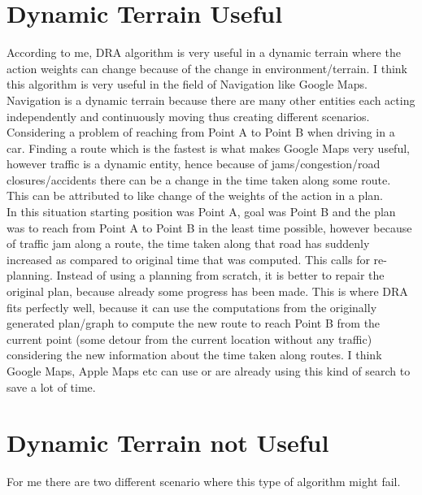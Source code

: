 \documentclass[a4paper]{article}
\begin{document}
\section{Dynamic Terrain Useful}
\label{sec:Q1}

According to me, DRA\text{*} algorithm is very useful in a dynamic terrain where the action weights can change because of the change in environment/terrain. I think this algorithm is very useful in the field of Navigation like Google Maps. Navigation is a dynamic terrain because there are many other entities each acting independently and continuously moving thus creating different scenarios. Considering a problem of reaching from Point A to Point B when driving in a car. Finding a route which is the fastest is what makes Google Maps very useful, however traffic is a dynamic entity, hence because of jams/congestion/road closures/accidents there can be a change in the time taken along some route. This can be attributed to like change of the weights of the action in a plan. 
\\

In this situation starting position was Point A, goal was Point B and the plan was to reach from Point A to Point B in the least time possible, however because of traffic jam along a route, the time taken along that road has suddenly increased as compared to original time that was computed. This calls for re-planning. Instead of using a planning from scratch, it is better to repair the original plan, because already some progress has been made. This is where DRA\text{*} fits perfectly well, because it can use the computations from the originally generated plan/graph to compute the new route to reach Point B from the current point (some detour from the current location without any traffic) considering the new information about the time taken along routes. I think Google Maps, Apple Maps etc can use or are already using this kind of search to save a lot of time.
\\

\section{Dynamic Terrain not Useful}
\label{sec:Q2}

For me there are two different scenario where this type of algorithm might fail. 
\\
\end{document}
